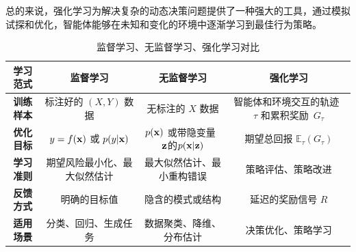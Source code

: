 总的来说，强化学习为解决复杂的动态决策问题提供了一种强大的工具，通过模拟试探和优化，智能体能够在未知和变化的环境中逐渐学习到最佳行为策略。



\begin{table}[htbp]
\centering
\begin{tabular}{|c|c|c|c|
}
\hline
{\bf 学习范式} & {\bf  监督学习} & {\bf 无监督学习} & {\bf 强化学习} \\
\hline
{\bf 训练样本} &  标注好的 $(X, Y)$ 数据  &  无标注的 $X$ 数据  &%
智能体和环境交互的轨迹~$\tau$ 和累积奖励~$G_\tau$  
 \\
\hline
{\bf 优化目标}  &  $y=f({\bf x})$ 或 $p(y|{\bf x})$  & $p({\bf x})$ 或带隐变量~${\bf z}$的$p({\bf x}|{\bf z})$ & 期望总回报 $\mathbb{E}_\tau(G_\tau)$ 
 \\
\hline
{\bf 学习准则} &  期望风险最小化、最大似然估计  & 最大似然估计、最小重构错误 & 策略评估、策略改进   \\
\hline
 {\bf 反馈方式}  & 明确的目标值  &隐含的模式或结构   &延迟的奖励信号 $R$   \\
\hline
  {\bf 适用场景} & 分类、回归、生成任务 &  数据聚类、降维、分布估计&决策优化、策略学习 \\
\hline
\end{tabular}
\caption{监督学习、无监督学习、强化学习对比}
\label{tab:3learning}
\end{table}


